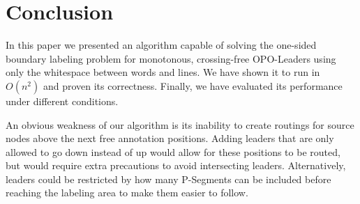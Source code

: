 \documentclass[11pt,a4paper]{vutinfth}
\begin{document}
\chapter{Conclusion}

In this paper we presented an algorithm capable of solving the one-sided boundary labeling problem for monotonous, crossing-free OPO-Leaders using only the whitespace between words and lines. We have shown it to run in $O(n^2)$ and proven its correctness. Finally, we have evaluated its performance under different conditions.

An obvious weakness of our algorithm is its inability to create routings for source nodes above the next free annotation positions. Adding leaders that are only allowed to go down instead of up would allow for these positions to be routed, but would require extra precautions to avoid intersecting leaders. Alternatively, leaders could be restricted by how many P-Segments can be included before reaching the labeling area to make them easier to follow.



\backmatter %



\end{document}
